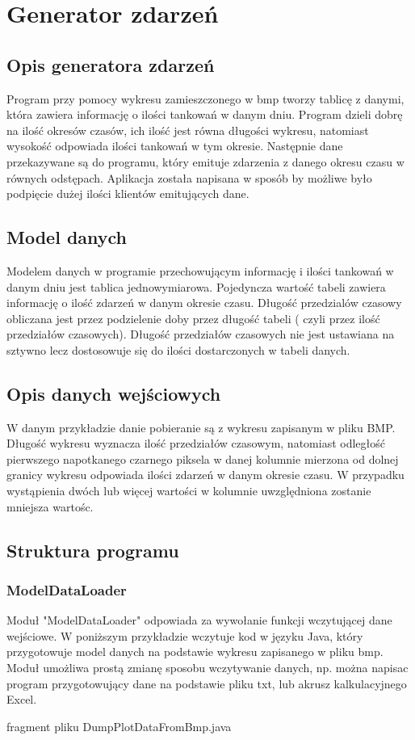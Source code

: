 \newpage
\section{Generator zdarzeń}
\label{sec:eventgenerator}

\subsection{Opis generatora zdarzeń}
Program przy pomocy wykresu zamieszczonego w bmp tworzy tablicę z danymi, która zawiera informację o ilości tankowań w danym dniu. Program dzieli dobrę na ilość okresów czasów, ich ilość jest równa długości wykresu, natomiast wysokość odpowiada ilości tankowań w tym okresie. Następnie dane przekazywane są do programu, który emituje zdarzenia z danego okresu czasu w równych odstępach. Aplikacja została napisana w sposób by możliwe było podpięcie dużej ilości klientów emitujących dane. 
\subsection{Model danych}
Modelem danych w programie przechowującym informację i ilości tankowań w danym dniu jest tablica jednowymiarowa. Pojedyncza wartość tabeli zawiera informację o ilość zdarzeń w danym okresie czasu. Długość przedzialów czasowy obliczana jest przez podzielenie doby przez długość tabeli ( czyli przez ilość przedziałów czasowych). Długość przedziałów czasowych nie jest ustawiana na sztywno lecz dostosowuje się do ilości dostarczonych w tabeli danych. 
\subsection{Opis danych wejściowych}
W danym przykładzie danie pobieranie są z wykresu zapisanym w pliku BMP. Długość wykresu wyznacza ilość przedziałów czasowym, natomiast odległość pierwszego napotkanego czarnego piksela w danej kolumnie mierzona od dolnej granicy wykresu odpowiada  ilości zdarzeń w danym okresie czasu. W przypadku wystąpienia dwóch lub więcej wartości w kolumnie uwzględniona zostanie mniejsza wartośc.
\subsection{Struktura programu}
\subsubsection {ModelDataLoader}
Moduł "ModelDataLoader" odpowiada za wywołanie funkcji wczytującej dane wejściowe. W poniższym przykładzie wczytuje kod w języku Java, który przygotowuje model danych na podstawie wykresu zapisanego w pliku bmp. Moduł umożliwa prostą zmianę sposobu wczytywanie danych, np. można napisac program przygotowujący dane na podstawie pliku txt, lub akrusz kalkulacyjnego Excel.

fragment pliku DumpPlotDataFromBmp.java

